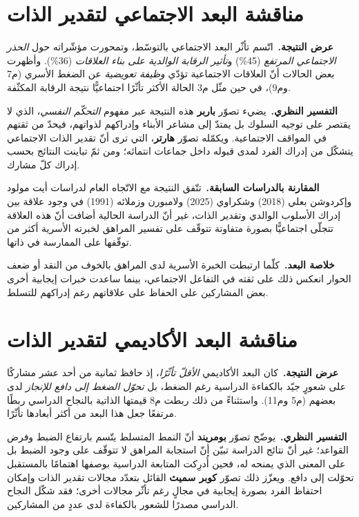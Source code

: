 \documentclass[12pt,oneside]{report}
\begin{document}
\section{مناقشة البعد الاجتماعي لتقدير الذات}
\noindent\textbf{عرض النتيجة.}\ اتّسم تأثّر البعد الاجتماعي بالتوسّط، وتمحورت مؤشّراته حول
\emph{الحذر الاجتماعي المرتفع} (45\%) و\emph{تأثير الرقابة الوالدية على بناء العلاقات} (36\%).
وأظهرت بعض الحالات أنّ العلاقات الاجتماعية تؤدّي \emph{وظيفة تعويضية} عن الضغط الأسري (م7 وم9)،
في حين مثّل م3 الحالة الأكثر تأثّرًا اجتماعيًّا نتيجة الرقابة المكثّفة.

\noindent\textbf{التفسير النظري.}\ يضيء تصوّر \textbf{باربر} هذه النتيجة عبر مفهوم \emph{التحكّم
النفسي}، الذي لا يقتصر على توجيه السلوك بل يمتدّ إلى مشاعر الأبناء وإدراكهم لذواتهم، فيحدّ من
ثقتهم في المواقف الاجتماعية. ويكمّله تصوّر \textbf{هارتر}، التي ترى أنّ تقدير الذات الاجتماعي
يتشكّل من إدراك الفرد لمدى قبوله داخل جماعات انتمائه؛ ومن ثمّ تباينت النتائج بحسب إدراك كلّ
مشارك.

\noindent\textbf{المقارنة بالدراسات السابقة.}\ تتّفق النتيجة مع الاتّجاه العام لدراسات أيت مولود
وإكردوشن بعلي (2018) وشكراوي (2025) ولامبورن وزملائه (1991) في وجود علاقة بين إدراك الأسلوب
الوالدي وتقدير الذات، غير أنّ الدراسة الحالية أضافت أنّ هذه العلاقة تتجلّى اجتماعيًّا بصورة
متفاوتة تتوقّف على تفسير المراهق لخبرته الأسرية أكثر من توقّفها على الممارسة في ذاتها.

\noindent\textbf{خلاصة البعد.}\ كلّما ارتبطت الخبرة الأسرية لدى المراهق بالخوف من النقد أو ضعف
الحوار انعكس ذلك على ثقته في التفاعل الاجتماعي، بينما ساعدت خبرات إيجابية أخرى بعض المشاركين على
الحفاظ على علاقاتهم رغم إدراكهم للتسلط.

\section{مناقشة البعد الأكاديمي لتقدير الذات}
\noindent\textbf{عرض النتيجة.}\ كان البعد الأكاديمي \emph{الأقلّ تأثّرًا}، إذ حافظ ثمانية من أحد
عشر مشاركًا على شعورٍ جيّد بالكفاءة الدراسية رغم الضغط، بل \emph{تحوّل الضغط إلى دافع للإنجاز}
لدى بعضهم (م5 وم11). واستثناءً من ذلك ربطت م8 قيمتها الذاتية بالنجاح الدراسي ربطًا مرتفعًا جعل
هذا البعد من أكثر أبعادها تأثّرًا.

\noindent\textbf{التفسير النظري.}\ يوضّح تصوّر \textbf{بومريند} أنّ النمط المتسلط يتّسم بارتفاع
الضبط وفرض القواعد؛ غير أنّ نتائج الدراسة تبيّن أنّ استجابة المراهق لا تتوقّف على وجود الضبط بل
على المعنى الذي يمنحه له، فحين أُدرِكت المتابعة الدراسية بوصفها اهتمامًا بالمستقبل تحوّلت إلى
دافع. ويعزّز ذلك تصوّر \textbf{كوبر سميث} القائل بتعدّد مجالات تقدير الذات وإمكان احتفاظ الفرد
بصورة إيجابية في مجالٍ رغم تأثّر مجالات أخرى؛ فقد شكّل النجاح الدراسي مصدرًا للشعور بالكفاءة لدى
عددٍ من المشاركين.
\end{document}
